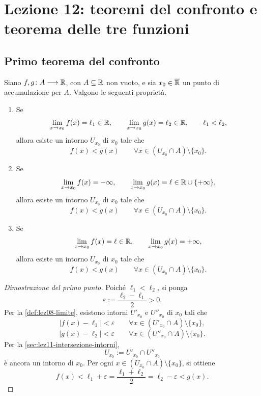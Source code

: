 \chapter[Lezione 12 --- 22 ottobre 2026]{Lezione 12: teoremi del confronto e teorema delle tre funzioni}
\label{chap:lezione-12}

\section{Primo teorema del confronto}
\label{sec:lez12-confronto-primo}

\begin{theorem}
\label{thm:lez12-confronto-primo}
Siano \(f,g\colon A\longrightarrow\mathbb{R}\), con
\(A\subseteq\mathbb{R}\) non vuoto, e sia
\(x_0\in\overline{\mathbb{R}}\) un punto di accumulazione per \(A\).
Valgono le seguenti proprietà.
\begin{enumerate}
  \item Se
  \[
    \lim_{x\to x_0}f(x)=\ell_1\in\mathbb{R},
    \qquad
    \lim_{x\to x_0}g(x)=\ell_2\in\mathbb{R},
    \qquad \ell_1<\ell_2,
  \]
  allora esiste un intorno \(U_{x_0}\) di \(x_0\) tale che
  \[
    f(x)<g(x)
    \qquad\forall x\in(U_{x_0}\cap A)\setminus\{x_0\}.
  \]
  \item Se
  \[
    \lim_{x\to x_0}f(x)=-\infty,
    \qquad
    \lim_{x\to x_0}g(x)=\ell\in\mathbb{R}\cup\{+\infty\},
  \]
  allora esiste un intorno \(U_{x_0}\) di \(x_0\) tale che
  \[
    f(x)<g(x)
    \qquad\forall x\in(U_{x_0}\cap A)\setminus\{x_0\}.
  \]
  \item Se
  \[
    \lim_{x\to x_0}f(x)=\ell\in\mathbb{R},
    \qquad
    \lim_{x\to x_0}g(x)=+\infty,
  \]
  allora esiste un intorno \(U_{x_0}\) di \(x_0\) tale che
  \[
    f(x)<g(x)
    \qquad\forall x\in(U_{x_0}\cap A)\setminus\{x_0\}.
  \]
\end{enumerate}
\end{theorem}

\begin{proof}[Dimostrazione del primo punto]
Poiché \(\ell_1<\ell_2\), si ponga
\[
  \varepsilon:=\frac{\ell_2-\ell_1}{2}>0.
\]
Per la \cref{def:lez08-limite}, esistono intorni
\(U'_{x_0}\) e \(U''_{x_0}\) di \(x_0\) tali che
\[
  |f(x)-\ell_1|<\varepsilon
  \qquad\forall x\in(U'_{x_0}\cap A)\setminus\{x_0\},
\]
\[
  |g(x)-\ell_2|<\varepsilon
  \qquad\forall x\in(U''_{x_0}\cap A)\setminus\{x_0\}.
\]
Per la
\cref{sec:lez11-intersezione-intorni},
\[
  U_{x_0}:=U'_{x_0}\cap U''_{x_0}
\]
è ancora un intorno di \(x_0\). Per ogni
\(x\in(U_{x_0}\cap A)\setminus\{x_0\}\), si ottiene
\[
  f(x)<\ell_1+\varepsilon
  =\frac{\ell_1+\ell_2}{2}
  =\ell_2-\varepsilon<g(x).
\]
\end{proof}

